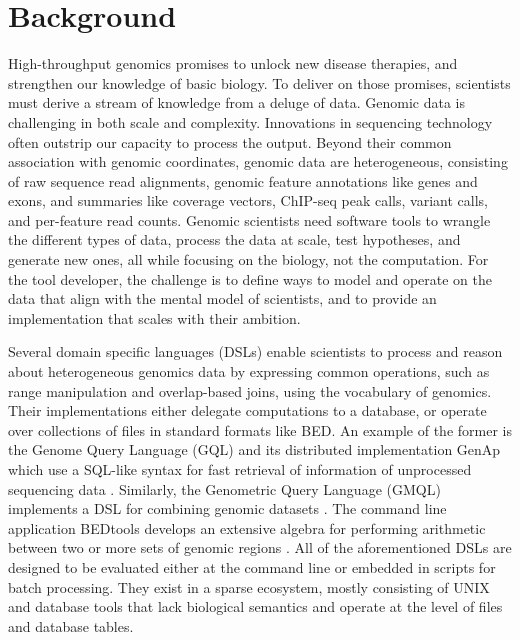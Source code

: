 \documentclass[]{article}
\begin{document}
\vskip 6.5pt


\noindent  \section{Background}\label{background}

High-throughput genomics promises to unlock new disease therapies, and
strengthen our knowledge of basic biology. To deliver on those promises,
scientists must derive a stream of knowledge from a deluge of data.
Genomic data is challenging in both scale and complexity. Innovations in
sequencing technology often outstrip our capacity to process the output.
Beyond their common association with genomic coordinates, genomic data
are heterogeneous, consisting of raw sequence read alignments, genomic
feature annotations like genes and exons, and summaries like coverage
vectors, ChIP-seq peak calls, variant calls, and per-feature read
counts. Genomic scientists need software tools to wrangle the different
types of data, process the data at scale, test hypotheses, and generate
new ones, all while focusing on the biology, not the computation. For
the tool developer, the challenge is to define ways to model and operate
on the data that align with the mental model of scientists, and to
provide an implementation that scales with their ambition.

Several domain specific languages (DSLs) enable scientists to process
and reason about heterogeneous genomics data by expressing common
operations, such as range manipulation and overlap-based joins, using
the vocabulary of genomics. Their implementations either delegate
computations to a database, or operate over collections of files in
standard formats like BED. An example of the former is the Genome Query
Language (GQL) and its distributed implementation GenAp which use a
SQL-like syntax for fast retrieval of information of unprocessed
sequencing data \autocites{Kozanitis2014-va}{Kozanitis2016-bm}.
Similarly, the Genometric Query Language (GMQL) implements a DSL for
combining genomic datasets \cite{Kaitoua2017-pw}. The command line
application BEDtools develops an extensive algebra for performing
arithmetic between two or more sets of genomic regions
\cite{Quinlan2010-gc}. All of the aforementioned DSLs are designed to be
evaluated either at the command line or embedded in scripts for batch
processing. They exist in a sparse ecosystem, mostly consisting of UNIX
and database tools that lack biological semantics and operate at the
level of files and database tables.
\end{document}
